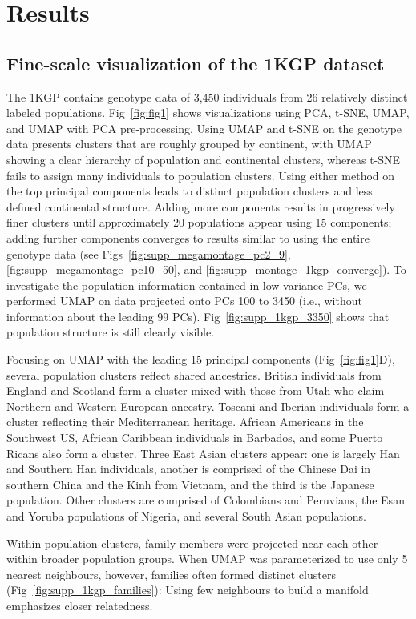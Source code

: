 \section{Results}
\subsection{Fine-scale visualization of the 1KGP dataset}

The 1KGP contains genotype data of 3,450 individuals from 26 relatively distinct labeled populations\citep{10002015global}. Fig~\ref{fig:fig1} shows visualizations using PCA, t-SNE, UMAP, and UMAP with PCA pre-processing. Using UMAP and t-SNE on the genotype data presents clusters that are roughly grouped by continent, with UMAP showing a clear hierarchy of population and continental clusters, whereas t-SNE fails to assign many individuals to population clusters. Using either method on the top principal components leads to distinct population clusters and less defined continental structure. Adding more components results in progressively finer clusters until approximately 20 populations appear using 15 components; adding further components converges to results similar to using the entire genotype data (see Figs~\ref{fig:supp_megamontage_pc2_9}, \ref{fig:supp_megamontage_pc10_50}, and \ref{fig:supp_montage_1kgp_converge}). To investigate the population information contained in low-variance PCs, we performed UMAP on data projected onto PCs 100 to 3450 (i.e., without information about the leading 99 PCs). Fig~\ref{fig:supp_1kgp_3350} shows that population structure is still clearly visible.

Focusing on UMAP with the leading 15 principal components (Fig~\ref{fig:fig1}D), several population clusters reflect shared ancestries. British individuals from England and Scotland form a cluster mixed with those from Utah who claim Northern and Western European ancestry. Toscani and Iberian individuals form a cluster reflecting their Mediterranean heritage. African Americans in the Southwest US, African Caribbean individuals in Barbados, and some Puerto Ricans also form a cluster. Three East Asian clusters appear: one is largely Han and Southern Han individuals, another is comprised of the Chinese Dai in southern China and the Kinh from Vietnam, and the third is the Japanese population. Other clusters are comprised of Colombians and Peruvians, the Esan and Yoruba populations of Nigeria, and several South Asian populations. 

Within population clusters, family members were projected near each other within broader population groups. When UMAP was parameterized to use only 5 nearest neighbours, however, families often formed distinct clusters (Fig~\ref{fig:supp_1kgp_families}): Using few neighbours to build a manifold emphasizes closer relatedness.


